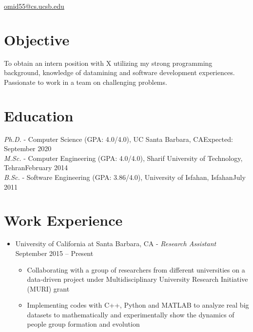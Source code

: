 \documentclass[letter]{res}
\begin{document}
\newif \iflong
\longtrue     %

\address{+1 (805) 886 7101}
\address{6520 El Colegio Rd, Apt 2308, Santa Barbara, CA 93106} \href{mailto:omid55@cs.ucsb.edu}{omid55@cs.ucsb.edu}
\begin{resume}
\noindent\makebox[\linewidth]{\rule{\paperwidth}{0.4pt}}


\section{Objective}
To obtain an intern position with X utilizing my strong programming background, knowledge of datamining and software development experiences. Passionate to work in a team on challenging problems.

\section{Education}
{\sl Ph.D.} - Computer Science (GPA: 4.0/4.0), UC Santa Barbara, CA\hfill Expected: September 2020\vspace{-1mm}\\
{\sl M.Sc.} - Computer Engineering (GPA: 4.0/4.0), Sharif University of Technology, Tehran\hfill February 2014\vspace{-1mm}\\
{\sl B.Sc.} - Software Engineering (GPA: 3.86/4.0), University of Isfahan, Isfahan\hfill July 2011\vspace{-1mm}


\section{Work Experience}
\begin{itemize}
\item University of California at Santa Barbara, CA \newline
   - {\sl Research Assistant} \hfill September 2015 – Present\\
   \vspace{-4mm}
   \iflong
     \begin{itemize}
     \item Collaborating with a group of researchers from different universities on a data-driven project under Multidisciplinary University Research Initiative (MURI) grant
     \item Implementing codes with C++, Python and MATLAB to analyze real big datasets to mathematically and experimentally show the dynamics of people group formation and evolution
     \end{itemize}
   \fi 
   

\end{itemize}
\end{resume}
\end{document}
